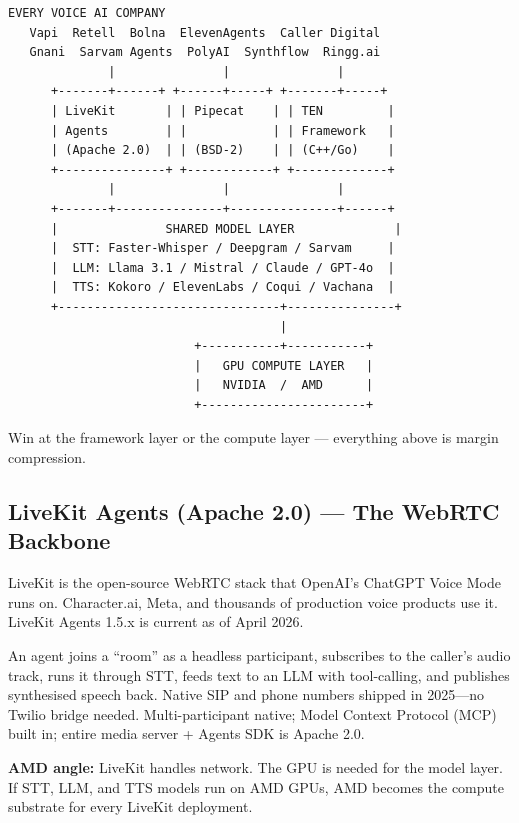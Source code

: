 \documentclass[12pt,a4paper]{article}
\begin{document}
\begin{lstlisting}[caption={Industry Convergence: Every Voice AI Company Builds on Three Frameworks},
                   label=lst:convergence,basicstyle=\ttfamily\scriptsize]
   EVERY VOICE AI COMPANY
   Vapi  Retell  Bolna  ElevenAgents  Caller Digital
   Gnani  Sarvam Agents  PolyAI  Synthflow  Ringg.ai
              |               |               |
      +-------+------+ +------+-----+ +-------+-----+
      | LiveKit       | | Pipecat    | | TEN         |
      | Agents        | |            | | Framework   |
      | (Apache 2.0)  | | (BSD-2)    | | (C++/Go)    |
      +---------------+ +------------+ +-------------+
              |               |               |
      +-------+---------------+---------------+------+
      |               SHARED MODEL LAYER              |
      |  STT: Faster-Whisper / Deepgram / Sarvam     |
      |  LLM: Llama 3.1 / Mistral / Claude / GPT-4o  |
      |  TTS: Kokoro / ElevenLabs / Coqui / Vachana  |
      +-------------------------------+---------------+
                                      |
                          +-----------+-----------+
                          |   GPU COMPUTE LAYER   |
                          |   NVIDIA  /  AMD      |
                          +-----------------------+
\end{lstlisting}

Win at the framework layer or the compute layer --- everything above is
margin compression.

\subsection{LiveKit Agents (Apache 2.0) --- The WebRTC Backbone}

LiveKit is the open-source WebRTC stack that OpenAI's ChatGPT Voice Mode
runs on.  Character.ai, Meta, and thousands of production voice products use
it.  LiveKit Agents 1.5.x is current as of April 2026.

An agent joins a ``room'' as a headless participant, subscribes to the
caller's audio track, runs it through STT, feeds text to an LLM with
tool-calling, and publishes synthesised speech back.  Native SIP and phone
numbers shipped in 2025---no Twilio bridge needed.  Multi-participant native;
Model Context Protocol (MCP) built in; entire media server + Agents SDK is
Apache 2.0.

\textbf{AMD angle:} LiveKit handles network.  The GPU is needed for the
model layer.  If STT, LLM, and TTS models run on AMD GPUs, AMD becomes the
compute substrate for every LiveKit deployment.
\end{document}
